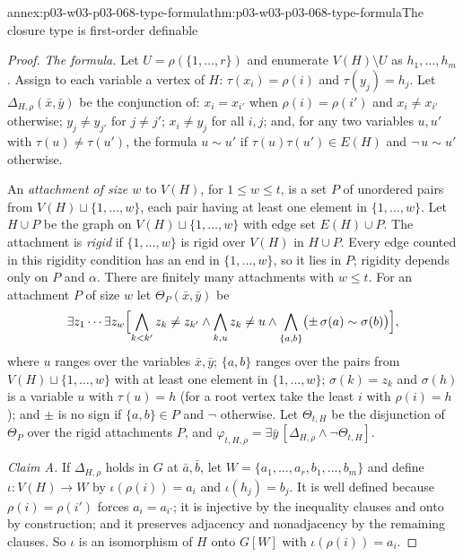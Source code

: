 \begin{annexitem}{annex:p03-w03-p03-068-type-formula}{thm:p03-w03-p03-068-type-formula}{The closure type is first-order definable}
\begin{proof}
\emph{The formula.}  Let \(U=\rho(\{1,\ldots,r\})\) and enumerate
\(V(H)\setminus U\) as \(h_1,\ldots,h_m\).  Assign to each variable a vertex
of \(H\): \(\tau(x_i)=\rho(i)\) and \(\tau(y_j)=h_j\).  Let
\(\Delta_{H,\rho}(\bar x,\bar y)\) be the conjunction of: \(x_i=x_{i'}\) when
\(\rho(i)=\rho(i')\) and \(x_i\neq x_{i'}\) otherwise; \(y_j\neq y_{j'}\) for
\(j\neq j'\); \(x_i\neq y_j\) for all \(i,j\); and, for any two variables
\(u,u'\) with \(\tau(u)\neq\tau(u')\), the formula \(u\sim u'\) if
\(\tau(u)\tau(u')\in E(H)\) and \(\neg\,u\sim u'\) otherwise.

An \emph{attachment of size \(w\)} to \(V(H)\), for \(1\leq w\leq t\), is a set
\(P\) of unordered pairs from \(V(H)\sqcup\{1,\ldots,w\}\), each pair having at
least one element in \(\{1,\ldots,w\}\).  Let \(H\cup P\) be the graph on
\(V(H)\sqcup\{1,\ldots,w\}\) with edge set \(E(H)\cup P\).  The attachment is
\emph{rigid} if \(\{1,\ldots,w\}\) is rigid over \(V(H)\) in \(H\cup P\).  Every
edge counted in this rigidity condition has an end in \(\{1,\ldots,w\}\), so it
lies in \(P\); rigidity depends only on \(P\) and \(\alpha\).  There are
finitely many attachments with \(w\leq t\).  For an attachment \(P\) of size
\(w\) let \(\Theta_P(\bar x,\bar y)\) be
\[
  \exists z_1\cdots\exists z_w\Bigl[\bigwedge_{k<k'}z_k\neq z_{k'}\wedge
  \bigwedge_{k,u}z_k\neq u\wedge\bigwedge_{\{a,b\}}\bigl(\pm\,
  \sigma(a)\sim\sigma(b)\bigr)\Bigr],
\]
where \(u\) ranges over the variables \(\bar x,\bar y\); \(\{a,b\}\) ranges
over the pairs from \(V(H)\sqcup\{1,\ldots,w\}\) with at least one element in
\(\{1,\ldots,w\}\); \(\sigma(k)=z_k\) and \(\sigma(h)\) is a variable \(u\) with
\(\tau(u)=h\) (for a root vertex take the least \(i\) with \(\rho(i)=h\)); and
\(\pm\) is no sign if \(\{a,b\}\in P\) and \(\neg\) otherwise.  Let
\(\Theta_{t,H}\) be the disjunction of \(\Theta_P\) over the rigid
attachments \(P\), and \(\varphi_{t,H,\rho}=\exists\bar
y\,[\Delta_{H,\rho}\wedge\neg\Theta_{t,H}]\).

\emph{Claim A.}  If \(\Delta_{H,\rho}\) holds in \(G\) at \(\bar a,\bar b\), let
\(W=\{a_1,\ldots,a_r,b_1,\ldots,b_m\}\) and define \(\iota\colon V(H)\to W\) by
\(\iota(\rho(i))=a_i\) and \(\iota(h_j)=b_j\).  It is well defined because
\(\rho(i)=\rho(i')\) forces \(a_i=a_{i'}\); it is injective by the inequality
clauses and onto by construction; and it preserves adjacency and nonadjacency
by the remaining clauses.  So \(\iota\) is an isomorphism of \(H\) onto
\(G[W]\) with \(\iota(\rho(i))=a_i\).


\end{proof}
\end{annexitem}
